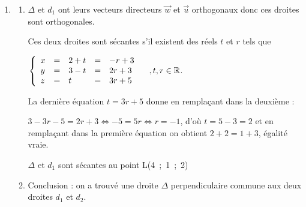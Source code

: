 \documentclass[10pt]{article}
\providecommand{\R}{\mathbb{R}}
\providecommand{\vect}[1]{\overrightarrow{#1}}
\begin{document}
\begin{enumerate}
\begin{enumerate}
$\left\{\begin{array}{l c l}
x &=&2k - 3\\
y &=&k\\
z &=&5\\
5x + 4y - z - 22 &=& 0
\end{array}\right. \quad , t \in \R$, d'où en remplaçant $x,\:y,\:z$ dans la dernière équation :

$5(2k - 3) + 4(k) - 5 - 22 = 0\iff 10k - 15 + 4k - 27 = 0\iff 14k = 42 \iff 7k = 21 \iff k = 3$.

Le point commun au plan $P$ et à la droite $d_2$ a pour coordonnées (6 - 3~;~3~;~5) soit M(3~;~3~;~5).
	\end{enumerate}
\item 	
	\begin{enumerate}
		\item $\Delta$ et $d_1$ ont leurs vecteurs directeurs $\vect{w}$ et $\vect{u}$  orthogonaux donc ces droites sont orthogonales.
		
Ces deux droites sont sécantes s'il existent des réels $t$ et $r$ tels que 

$\left\{\begin{array}{l c l c l}
x&=&2 + t&=&- r + 3\\
y&=&3 - t&=&2r + 3\\
z&=&t   &=&3r + 5
\end{array}\right. \quad , t, r  \in \R$.

La dernière équation $t = 3r + 5$ donne en remplaçant dans la deuxième : 

$3 - 3r - 5 = 2r + 3 \iff - 5 = 5r \iff r = - 1$, d'où $t = 5 - 3 = 2$ et en remplaçant dans la première équation on obtient $2 + 2 = 1 + 3$, égalité vraie.

$\Delta$ et $d_1$ sont sécantes au point L(4~;~1~;~2)
		\item  Conclusion : on a trouvé une droite $\Delta$ perpendiculaire commune aux deux droites $d_1$ et $d_2$.
	\end{enumerate}
\end{enumerate}

\bigskip
\end{document}
